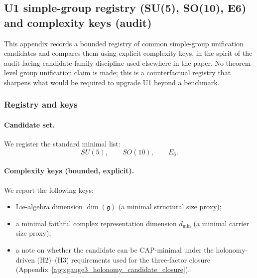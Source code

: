 \subsection{U1 simple-group registry (SU(5), SO(10), E6) and complexity keys (audit)}
\label{app:u1_simple_group_registry_audit}

This appendix records a bounded registry of common simple-group unification candidates and compares them using explicit complexity keys, in the spirit of the audit-facing candidate-family discipline used elsewhere in the paper.
No theorem-level group unification claim is made; this is a counterfactual registry that sharpens what would be required to upgrade U1 beyond a benchmark.

\subsubsection{Registry and keys}
\paragraph{Candidate set.}
\AuditTag We register the standard minimal list:
\[
SU(5),\qquad SO(10),\qquad E_6.
\]

\paragraph{Complexity keys (bounded, explicit).}
\AuditTag We report the following keys:
\begin{itemize}
\item Lie-algebra dimension $\dim(\mathfrak{g})$ (a minimal structural size proxy);
\item a minimal faithful complex representation dimension $d_{\min}$ (a minimal carrier size proxy);
\item a note on whether the candidate can be CAP-minimal under the holonomy-driven (H2)--(H3) requirements used for the three-factor closure (Appendix~\ref{app:gauge3_holonomy_candidate_closure}).
\end{itemize}

